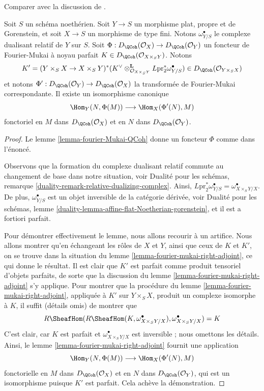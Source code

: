 \begin{lemma}
\label{lemma-fourier-mukai-left-adjoint}
\begin{reference}
Comparer avec la discussion de \cite{Rizzardo}.
\end{reference}
Soit $S$ un schéma noethérien. Soit $Y \to S$ un morphisme plat, propre
et de Gorenstein, et soit $X \to S$ un morphisme de type fini.
Notons $\omega^\bullet_{Y/S}$ le complexe dualisant relatif de
$Y$ sur $S$. Soit $\Phi : D_\QCoh(\mathcal{O}_X) \to D_\QCoh(\mathcal{O}_Y)$
un foncteur de Fourier-Mukai à noyau parfait
$K \in D_\QCoh(\mathcal{O}_{X \times_S Y})$. Notons
$$
K' = (Y \times_S X \to X \times_S Y)^*(K^\vee
\otimes_{\mathcal{O}_{X \times_S Y}}^\mathbf{L}
L\text{pr}_2^*\omega^\bullet_{Y/S})
\in
D_\QCoh(\mathcal{O}_{Y \times_S X})
$$
et notons $\Phi' : D_\QCoh(\mathcal{O}_Y) \to D_\QCoh(\mathcal{O}_X)$
la transformée de Fourier-Mukai correspondante. Il existe un isomorphisme
canonique
$$
\Hom_Y(N, \Phi(M)) \longrightarrow \Hom_X(\Phi'(N), M)
$$
fonctoriel en $M$ dans $D_\QCoh(\mathcal{O}_X)$ et en $N$ dans
$D_\QCoh(\mathcal{O}_Y)$.
\end{lemma}

\begin{proof}
Le lemme \ref{lemma-fourier-Mukai-QCoh} donne un foncteur $\Phi$
comme dans l'énoncé.

\medskip\noindent
Observons que la formation du complexe dualisant relatif commute
au changement de base dans notre situation, voir Dualité pour les schémas,
remarque \ref{duality-remark-relative-dualizing-complex}.
Ainsi, $L\text{pr}_2^*\omega^\bullet_{Y/S} = \omega^\bullet_{X \times_S Y/X}$.
De plus, $\omega^\bullet_{Y/S}$ est un objet
inversible de la catégorie dérivée, voir Dualité pour les schémas, lemme
\ref{duality-lemma-affine-flat-Noetherian-gorenstein}, et il est a fortiori
parfait.

\medskip\noindent
Pour démontrer effectivement le lemme, nous allons recourir à un artifice. Nous allons
montrer qu'en échangeant les rôles de $X$ et $Y$, ainsi que ceux de $K$ et $K'$,
on se trouve dans la situation du lemme \ref{lemma-fourier-mukai-right-adjoint},
ce qui donne le résultat. Il est clair que $K'$ est parfait comme
produit tensoriel d'objets parfaits, de sorte que la discussion du
lemme \ref{lemma-fourier-mukai-right-adjoint} s'y applique.
Pour montrer que la procédure du
lemme \ref{lemma-fourier-mukai-right-adjoint}, appliquée à $K'$
sur $Y \times_S X$, produit un complexe isomorphe à $K$, il suffit
(détails omis) de montrer que
$$
R\SheafHom(R\SheafHom(K, \omega^\bullet_{X \times_S Y/X}),
\omega^\bullet_{X \times_S Y/X}) = K
$$
C'est clair, car $K$ est parfait et $\omega^\bullet_{X \times_S Y/X}$
est inversible ; nous omettons les détails. Ainsi, le
lemme \ref{lemma-fourier-mukai-right-adjoint} fournit une application
$$
\Hom_Y(N, \Phi(M)) \longrightarrow \Hom_X(\Phi'(N), M)
$$
fonctorielle en $M$ dans $D_\QCoh(\mathcal{O}_X)$ et en $N$ dans
$D_\QCoh(\mathcal{O}_Y)$, qui est un isomorphisme puisque
$K'$ est parfait. Cela achève la démonstration.
\end{proof}

